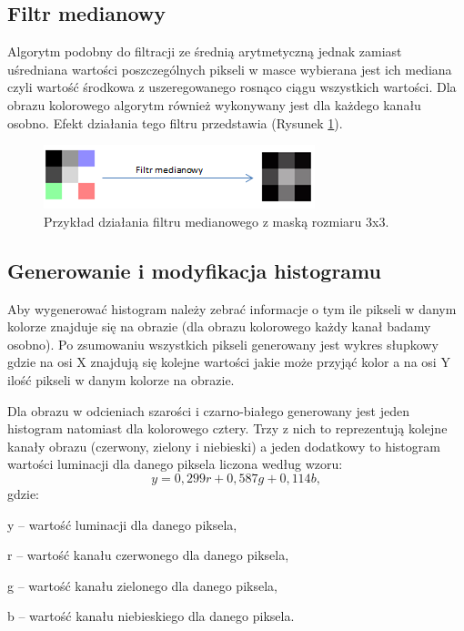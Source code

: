 \documentclass{classrep}
\begin{document}
\subsection{Filtr medianowy}
Algorytm podobny do filtracji ze średnią arytmetyczną jednak zamiast uśredniana wartości poszczególnych pikseli w masce wybierana jest ich mediana czyli wartość środkowa z uszeregowanego rosnąco ciągu wszystkich wartości. Dla obrazu kolorowego algorytm również wykonywany jest dla każdego kanału osobno. Efekt działania tego filtru przedstawia (Rysunek \ref{fig:medianFilter}).
\begin{figure}[h!]
\centering
\includegraphics[width=7.89cm]{obrazy/medianFilter.png} 
\caption[Filtr medianowy]{Przykład działania filtru medianowego z maską rozmiaru 3x3.}
\label{fig:medianFilter}
\end{figure}

\subsection{Generowanie i modyfikacja histogramu}
Aby wygenerować histogram należy zebrać informacje o tym ile pikseli w danym kolorze znajduje się na obrazie (dla obrazu kolorowego każdy kanał badamy osobno). Po zsumowaniu wszystkich pikseli generowany jest wykres słupkowy gdzie na osi X znajdują się kolejne wartości jakie może przyjąć kolor a na osi Y ilość pikseli w danym kolorze na obrazie.

Dla obrazu w odcieniach szarości i czarno-białego generowany jest jeden histogram natomiast dla kolorowego cztery. Trzy z nich to reprezentują kolejne kanały obrazu (czerwony, zielony i niebieski) a jeden dodatkowy to histogram wartości luminacji dla danego piksela liczona według wzoru:
\begin{equation}
 y = 0,299r + 0,587g + 0,114b, \label{luminacja}
 \end{equation}
gdzie:
\begin{description}
\item y -- wartość luminacji dla danego piksela,
\item r -- wartość kanału czerwonego dla danego piksela,
\item g -- wartość kanału zielonego dla danego piksela,
\item b -- wartość kanału niebieskiego dla danego piksela.
\end{description}
\end{document}

